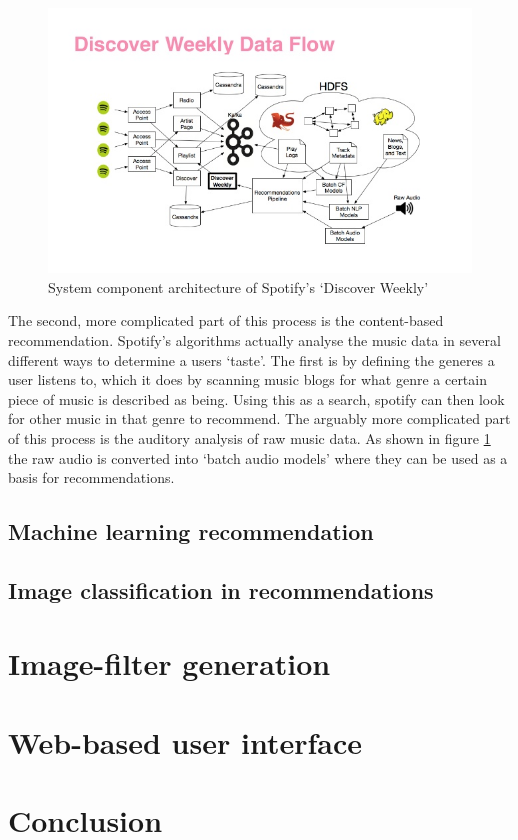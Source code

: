 \documentclass[a4paper,12pt]{article}
\begin{document}
      \begin{figure}[ht]
        \centering
        \includegraphics[width=\linewidth]{images/discoverweekly-dataflow}
        \caption[System component architecture of Spotify's ‘Discover Weekly’]{System component architecture of Spotify's ‘Discover Weekly’ \protect\citep{johnson2015dw}}
        \label{fig:discoverweekly-dataflow}
      \end{figure}

      The second, more complicated part of this process is the content-based recommendation. Spotify's algorithms actually analyse the music data in several different ways to determine a users ‘taste’. The first is by defining the generes a user listens to, which it does by scanning music blogs for what genre a certain piece of music is described as being. Using this as a search, spotify can then look for other music in that genre to recommend. The arguably more complicated part of this process is the auditory analysis of raw music data. As shown in figure \ref{fig:discoverweekly-dataflow} the raw audio is converted into ‘batch audio models’ where they can be used as a basis for recommendations.

  \subsection{Machine learning recommendation}

  \subsection{Image classification in recommendations}

\section{Image-filter generation}

\section{Web-based user interface}

\section{Conclusion}

\newpage
\singlespacing



\end{document}
